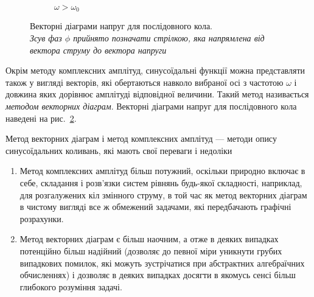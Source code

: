 \documentclass[]{LabWork}
\begin{document}
\begin{figure}[h!]
\begin{subfigure}[b]{0.30\linewidth}
		\caption{$\omega > \omega_0$}
		\label{pic:S-vector_diagrams>}
	\end{subfigure}
	\caption{Векторні діаграми напруг для послідовного кола. \\ {\small \itshape Зсув фаз $\phi$ прийнято позначати стрілкою, яка напрямлена від вектора струму до вектора напруги}}
	\label{pic:S-vector_diagrams}
\end{figure}

Окрім методу комплексних амплітуд, синусоїдальні функції можна представляти також у вигляді векторів, які обертаються навколо вибраної осі з частотою $\omega$ і довжина яких дорівнює амплітуді відповідної величини. Такий метод називається \emph{методом векторних діаграм}. Векторні діаграми напруг для послідовного кола наведені на рис.~\ref{pic:S-vector_diagrams}.

\begin{More}

	Метод векторних діаграм і метод комплексних амплітуд --- методи опису синусоїдальних коливань, які мають свої переваги і недоліки
	\begin{enumerate}[label=$\checkmark$]
		\item Метод комплексних амплітуд більш потужний, оскільки природно включає в себе, складання і розв'язки систем рівнянь будь-якої складності, наприклад, для розгалужених кіл змінного струму, в той час як метод векторних діаграм в чистому вигляді все ж обмежений задачами, які передбачають графічні розрахунки.
		\item Метод векторних діаграм є більш наочним, а отже в деяких випадках потенційно більш надійний (дозволяє до певної міри уникнути грубих випадкових помилок, які можуть зустрічатися при абстрактних алгебраїчних обчисленнях) і дозволяє в деяких випадках досягти в якомусь сенсі більш глибокого розуміння задачі.
	\end{enumerate}
\end{More}
\end{document}
